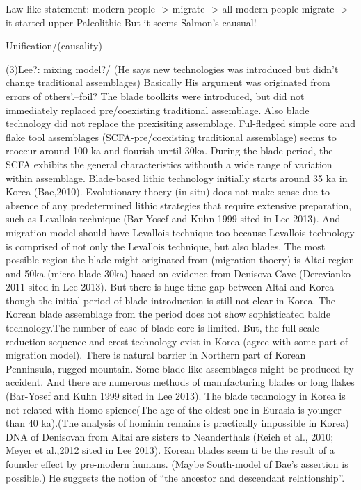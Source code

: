 \documentclass[american,man]{apa6}
\begin{document}
Law like statement: modern people -\textgreater{} migrate
-\textgreater{} all modern people migrate -\textgreater{} it started
upper Paleolithic But it seems Salmon's causual!

Unification/(causality)

(3)Lee?: mixing model?/ (He says new technologies was introduced but
didn't change traditional assemblages) Basically His argument was
originated from errors of others'.--foil? The blade toolkits were
introduced, but did not immediately replaced pre/coexisting traditional
assemblage. Also blade technology did not replace the prexisiting
assemblage. Ful-fledged simple core and flake tool assemblages
(SCFA-pre/coexisting traditional assemblage) seems to reoccur around 100
ka and flourish unrtil 30ka. During the blade period, the SCFA exhibits
the general characteristics withouth a wide range of variation within
assemblage. Blade-based lithic technology initially starts around 35 ka
in Korea (Bae,2010). Evolutionary thoery (in situ) does not make sense
due to absence of any predetermined lithic strategies that require
extensive preparation, such as Levallois technique (Bar-Yosef and Kuhn
1999 sited in Lee 2013). And migration model should have Levallois
technique too because Levallois technology is comprised of not only the
Levallois technique, but also blades. The most possible region the blade
might originated from (migration thoery) is Altai region and 50ka (micro
blade-30ka) based on evidence from Denisova Cave (Derevianko 2011 sited
in Lee 2013). But there is huge time gap between Altai and Korea though
the initial period of blade introduction is still not clear in Korea.
The Korean blade assemblage from the period does not show sophisticated
balde technology.The number of case of blade core is limited. But, the
full-scale reduction sequence and crest technology exist in Korea (agree
with some part of migration model). There is natural barrier in Northern
part of Korean Penninsula, rugged mountain. Some blade-like assemblages
might be produced by accident. And there are numerous methods of
manufacturing blades or long flakes (Bar-Yosef and Kuhn 1999 sited in
Lee 2013). The blade technology in Korea is not related with Homo
spience(The age of the oldest one in Eurasia is younger than 40 ka).(The
analysis of hominin remains is practically impossible in Korea) DNA of
Denisovan from Altai are sisters to Neanderthals (Reich et al., 2010;
Meyer et al.,2012 sited in Lee 2013). Korean blades seem ti be the
result of a founder effect by pre-modern humans. (Maybe South-model of
Bae's assertion is possible.) He suggests the notion of \enquote{the
ancestor and descendant relationship}.
\end{document}
